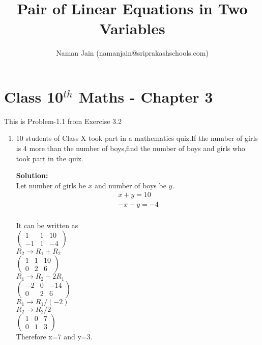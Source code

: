 \documentclass[10pt]{article}
\title{Pair of Linear Equations in Two Variables}
\author{Naman Jain (namanjain@sriprakashschools.com)}
\newcommand{\myvec}[1]{\ensuremath{\begin{pmatrix}#1\end{pmatrix}}}
\newcommand{\solution}{\noindent \textbf{Solution: }}
\begin{document}
\maketitle
\section*{Class 10$^{th}$ Maths - Chapter 3}
This is Problem-1.1 from Exercise 3.2
\begin{enumerate}
\item 10 students of Class X took part in a mathematics quiz.If the number of girls is 4 more than the number of boys,find the number of boys and girls who took part in the quiz.
	
\solution \\
Let number of girls be $x$ and number of boys be $y$.\\
\begin{align}
x+y=10\\
-x+y=-4\\
\end{align}

It can be written as \\

\myvec{1&1&10\\-1&1&-4}\\ 

$R_2 \xrightarrow\ R_1+R_2$\\ 
 \myvec{1&1&10\\0&2&6}\\
 
$R_1 \xrightarrow\ R_2-2R_1$\\
\myvec{-2&0&-14\\0&2&6}\\


$R_1 \xrightarrow\ R_1/(-2)$\\
$R_2 \xrightarrow\ R_2/2$\\
\myvec{1&0&7\\0&1&3}\\

Therefore x=7 and y=3.
\end{enumerate}
\end{document}
